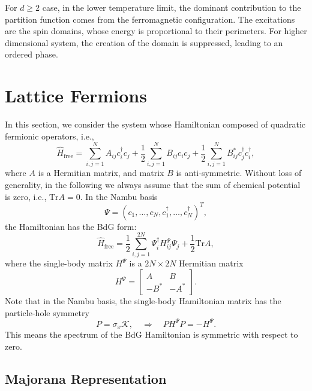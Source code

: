 For $d\ge 2$ case, in the lower temperature limit, the dominant contribution to the partition function comes from the ferromagnetic configuration.
The excitations are the spin domains, whose energy is proportional to their perimeters.
For higher dimensional system, the creation of the domain is suppressed, leading to an ordered phase.



\section{Lattice Fermions}
In this section, we consider the system whose Hamiltonian composed of quadratic fermionic operators, i.e.,
\begin{equation}
	\hat H_{\mathrm{free}} = \sum_{i,j=1}^N A_{ij} c_i^\dagger c_j + \frac{1}{2}\sum_{i,j=1}^N B_{ij} c_i c_j + \frac{1}{2}\sum_{i,j=1}^N B_{ij}^* c_j^\dagger c_i^\dagger, \label{eq:lattice-free-fermion-hamiltonian}
\end{equation}
where $A$ is a Hermitian matrix, and matrix $B$ is anti-symmetric.
Without loss of generality, in the following we always assume that the sum of chemical potential is zero, i.e., $\mathrm{Tr} A=0$.
In the Nambu basis 
\begin{equation}
	\Psi = (c_1,\dots,c_N,c_1^\dagger,\dots,c_N^\dagger)^T,
\end{equation}
the Hamiltonian has the BdG form:
\begin{equation}
	\hat H_{\mathrm{free}} = \frac{1}{2} \sum_{i,j=1}^{2N} \Psi^\dagger_i H_{ij}^{\Psi} \Psi_j + \frac{1}{2}\mathrm{Tr}A,
\end{equation}
where the single-body matrix $H^{\Psi}$ is a $2N\times 2N$ Hermitian matrix
\begin{equation}
	H^{\Psi} = \left[\begin{array}{cc} 
		A & B \\
		-B^* & -A^* 
	\end{array}\right].
\end{equation}
Note that in the Nambu basis, the single-body Hamiltonian matrix has the particle-hole symmetry
\begin{equation}
	P = \sigma_x \mathcal K, 
	\quad \Longrightarrow \quad
	P H^{\Psi} P = -H^{\Psi}.
\end{equation}
This means the spectrum of the BdG Hamiltonian is symmetric with respect to zero.


\subsection{Majorana Representation}

